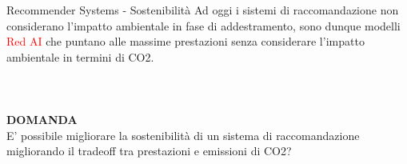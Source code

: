 \begin{frame}{Recommender Systems -  Sostenibilità}
    Ad oggi i sistemi di raccomandazione non considerano l'impatto ambientale in fase di addestramento, sono dunque modelli \textcolor{red}{Red AI} che puntano alle massime prestazioni senza considerare l'impatto ambientale in termini di CO2.\\
    \textcolor{white}{\textbf{.}}\\
\textcolor{white}{\textbf{.}}\\
\textcolor{white}{\textbf{.}}\\
    \textbf{DOMANDA}\\
    E' possibile migliorare la sostenibilità di un sistema di raccomandazione migliorando il trade\-off tra prestazioni e emissioni di CO2?
\end{frame}
